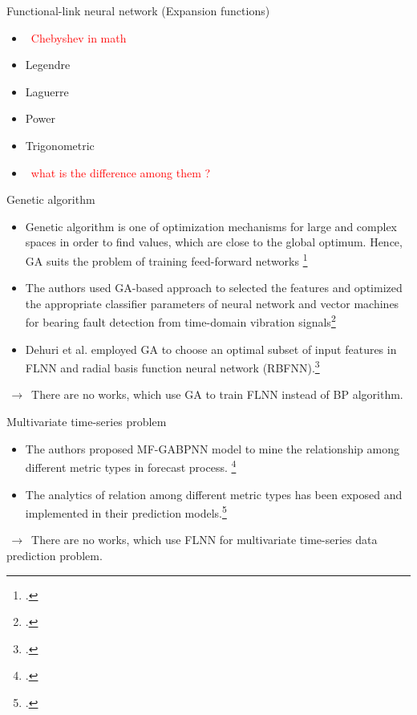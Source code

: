 \documentclass{beamer}
\def \GN#1{\textcolor{red}{~#1}}				%
\begin{document}
\begin{frame}{Functional-link neural network (Expansion functions)}
	\begin{itemize}
		\item \GN{Chebyshev in math}
		\item Legendre
		\item Laguerre
		\item Power
		\item Trigonometric
	\end{itemize}
	\begin{itemize}
		\item \GN{what is the difference among them ?}
	\end{itemize}
\end{frame}


\begin{frame}{Genetic algorithm}
	\begin{itemize}
		\item{
			\small Genetic algorithm is one of optimization mechanisms for large and complex spaces in order to find values, which are close to the global optimum. Hence, GA suits the problem of training feed-forward networks \footcite{Montana et al. 1989}
		}
		\item{
			\small The authors used GA-based approach to selected the features and optimized the appropriate classifier parameters of neural network and vector machines for bearing fault detection from time-domain vibration signals\footcite{Blanco et al. 2001}
		}
		\item{
			\small Dehuri et al. employed GA to choose an optimal subset of input features in FLNN and radial basis function neural network (RBFNN).\footcite{Dehuri et al. 2008}
		}
	\end{itemize}
	$\,\to\,$ There are no works, which use GA to train FLNN instead of BP algorithm.
\end{frame}

\begin{frame}{Multivariate time-series problem}
	\begin{itemize}
		\item{
			\small The authors proposed MF-GABPNN model to mine the relationship among different metric types in forecast process. \footcite{Tran et al. 2017}
		}
		\item{
			\small The analytics of relation among different metric types has been exposed and implemented in their prediction models.\footcite{Tran et al. 2018}
		}
	\end{itemize}
	$\,\to\,$ There are no works, which use FLNN for multivariate time-series data prediction problem.
\end{frame}
\end{document}
